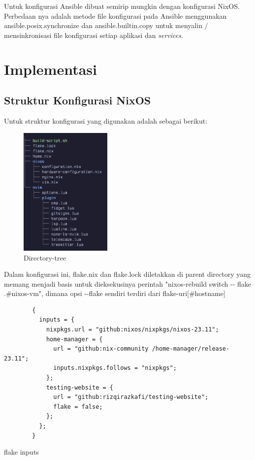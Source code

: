 \documentclass[10pt,]{report}
\newenvironment{code}{\captionsetup{type=listing}}{\vspace{3mm}}
\begin{document}
Untuk konfigurasi Ansible dibuat semirip mungkin dengan konfigurasi NixOS.
Perbedaan nya adalah metode file konfigurasi pada Ansible menggunakan
ansible.posix.synchronize dan ansible.builtin.copy untuk menyalin /
mensinkronisasi file konfigurasi setiap aplikasi dan \textit{services}.
\vspace{3mm}
\section{Implementasi}
\begin{adjustwidth}{20pt}{}
	\subsection{Struktur Konfigurasi NixOS}
	\begin{adjustwidth}{20pt}{}
		\vspace{-3mm}
		Untuk struktur konfigurasi yang digunakan adalah sebagai berikut:
		\begin{figure}[H]
			\centering
			\includegraphics[width=0.4\textwidth]{images/directory-tree.png}
			\caption{Directory-tree}
		\end{figure}

		Dalam konfigurasi ini, flake.nix dan flake.lock diletakkan di parent
		directory yang memang menjadi basis untuk dieksekusinya perintah
		"nixos-rebuild switch -{}- flake .\#nixos-vm", dimana opsi -{}-flake sendiri
		terdiri dari flake-uri[\#hostname]

		\begin{code}
			\begin{verbatim}
        {
          inputs = {
            nixpkgs.url = "github:nixos/nixpkgs/nixos-23.11";
            home-manager = {
              url = "github:nix-community /home-manager/release-23.11";
              inputs.nixpkgs.follows = "nixpkgs";
            };
            testing-website = {
              url = "github:rizqirazkafi/testing-website";
              flake = false;
            };
          };
        }
      \end{verbatim}
			\caption{flake inputs}
		\end{code}



\end{adjustwidth}
\end{adjustwidth}
\end{document}
